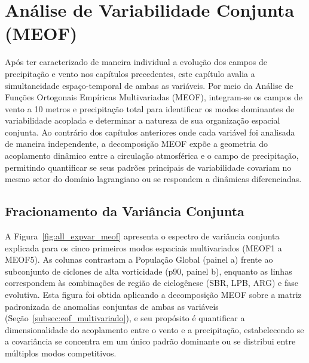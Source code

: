 \chapter{Análise de Variabilidade Conjunta (MEOF)}
\label{chap:meof}

Após ter caracterizado de maneira individual a evolução dos campos de precipitação e vento nos capítulos precedentes, este capítulo avalia a simultaneidade espaço-temporal de ambas as variáveis.
Por meio da Análise de Funções Ortogonais Empíricas Multivariadas (MEOF), integram-se os campos de vento a 10 metros e precipitação total para identificar os modos dominantes de variabilidade acoplada e determinar a natureza de sua organização espacial conjunta.
Ao contrário dos capítulos anteriores onde cada variável foi analisada de maneira independente, a decomposição MEOF expõe a geometria do acoplamento dinâmico entre a circulação atmosférica e o campo de precipitação, permitindo quantificar se seus padrões principais de variabilidade covariam no mesmo setor do domínio lagrangiano ou se respondem a dinâmicas diferenciadas.

\section{Fracionamento da Variância Conjunta}
\label{sec:meof_varianza}

A Figura~\ref{fig:all_expvar_meof} apresenta o espectro de variância conjunta explicada para os cinco primeiros modos espaciais multivariados (MEOF1 a MEOF5).
As colunas contrastam a População Global (painel a) frente ao subconjunto de ciclones de alta vorticidade (p90, painel b), enquanto as linhas correspondem às combinações de região de ciclogênese (SBR, LPB, ARG) e fase evolutiva.
Esta figura foi obtida aplicando a decomposição MEOF sobre a matriz padronizada de anomalias conjuntas de ambas as variáveis (Seção~\ref{subsec:eof_multivariado}), e seu propósito é quantificar a dimensionalidade do acoplamento entre o vento e a precipitação, estabelecendo se a covariância se concentra em um único padrão dominante ou se distribui entre múltiplos modos competitivos.

